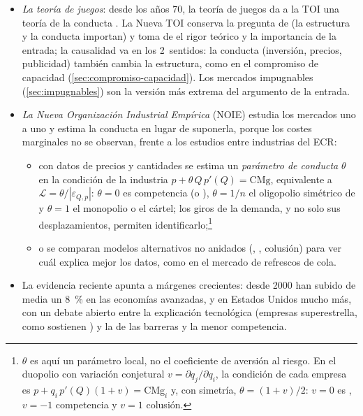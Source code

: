 \documentclass[11pt]{article}
\begin{document}
\begin{itemize}
\item \emph{La teoría de juegos}: desde los años 70, la teoría de juegos da a la TOI una teoría de la conducta\nocite{Tirole1988Theory} . La Nueva TOI conserva la pregunta de  (la estructura y la conducta importan) y toma de  el rigor teórico y la importancia de la entrada; la causalidad va en los 2~sentidos: la conducta (inversión, precios, publicidad) también cambia la estructura, como en el compromiso de capacidad (\ref{sec:compromiso-capacidad}). Los mercados impugnables (\ref{sec:impugnables}) son la versión más extrema del argumento de la entrada.
\item \emph{La Nueva Organización Industrial Empírica} (NOIE) estudia los mercados uno a uno y estima la conducta en lugar de suponerla, porque los costes marginales no se observan\nocite{Bresnahan1989Empirical}, frente a los estudios entre industrias del ECR\nocite{Schmalensee1989Inter}:
  \begin{itemize}
  \item con datos de precios y cantidades se estima un \emph{parámetro de conducta} $\theta$ en la condición de la industria $p+\theta\,Q\,p'(Q)=\mathrm{CMg}$, equivalente a $\mathcal{L}=\theta/|\varepsilon_{Q,p}|$: $\theta=0$ es competencia (o ), $\theta=1/n$ el oligopolio simétrico de  y $\theta=1$ el monopolio o el cártel; los giros de la demanda, y no solo sus desplazamientos, permiten identificarlo\nocite{Bresnahan1982Oligopoly};\footnote{$\theta$ es aquí un parámetro local, no el coeficiente de aversión al riesgo. En el duopolio con variación conjetural $v=\partial q_j/\partial q_i$, la condición de cada empresa es $p+q_i\,p'(Q)(1+v)=\mathrm{CMg}_i$ y, con simetría, $\theta=(1+v)/2$: $v=0$ es , $v=-1$ competencia y $v=1$ colusión.}
  \item o se comparan modelos alternativos no anidados (, , colusión) para ver cuál explica mejor los datos, como en el mercado de refrescos de cola\nocite{GasmiLaffontVuong1992Econometric}.
  \end{itemize}
\item La evidencia reciente apunta a márgenes crecientes: desde 2000 han subido de media un 8~\% en las economías avanzadas\nocite{FMI2019WEO}, y en Estados Unidos mucho más\nocite{DeLoeckerEeckhoutUnger2020Rise}, con un debate abierto entre la explicación tecnológica (empresas superestrella, como sostienen \textcite{AutorEtAl2020Fall}) y la de las barreras y la menor competencia\nocite{Philippon2019Great}.

\end{itemize}
\end{document}
